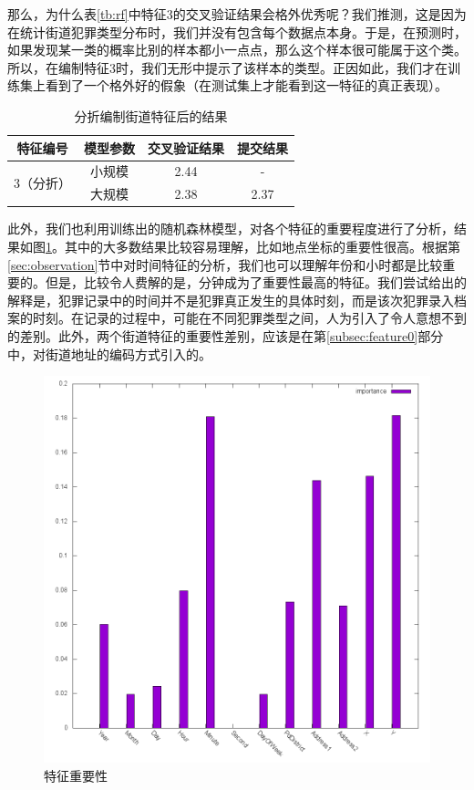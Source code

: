 那么，为什么表\ref{tb:rf}中特征3的交叉验证结果会格外优秀呢？我们推测，这是因为在统计街道犯罪类型分布时，我们并没有包含每个数据点本身。于是，在预测时，如果发现某一类的概率比别的样本都小一点点，那么这个样本很可能属于这个类。所以，在编制特征3时，我们无形中提示了该样本的类型。正因如此，我们才在训练集上看到了一个格外好的假象（在测试集上才能看到这一特征的真正表现）。

\begin{table}[tb]
    \centering
    \caption{分折编制街道特征后的结果}
    \label{tb:rf_3}
    \begin{tabular}{|c|c|c|c|}
    \hline
    特征编号               & 模型参数 & 交叉验证结果 & 提交结果 \\ \hline
    \multirow{2}{*}{3（分折）} & 小规模  & 2.44   & -    \\ \cline{2-4} 
                       & 大规模  & 2.38   & 2.37 \\ \hline
    \end{tabular}
\end{table}

此外，我们也利用训练出的随机森林模型，对各个特征的重要程度进行了分析，结果如图\ref{fig:importance}。其中的大多数结果比较容易理解，比如地点坐标的重要性很高。根据第\ref{sec:observation}节中对时间特征的分析，我们也可以理解年份和小时都是比较重要的。但是，比较令人费解的是，分钟成为了重要性最高的特征。我们尝试给出的解释是，犯罪记录中的时间并不是犯罪真正发生的具体时刻，而是该次犯罪录入档案的时刻。在记录的过程中，可能在不同犯罪类型之间，人为引入了令人意想不到的差别。此外，两个街道特征的重要性差别，应该是在第\ref{subsec:feature0}部分中，对街道地址的编码方式引入的。

\begin{figure}[tb]
    \centering
    \includegraphics[width=1.0\linewidth]{fig/importance}
    \caption{特征重要性}
    \label{fig:importance}
\end{figure}

